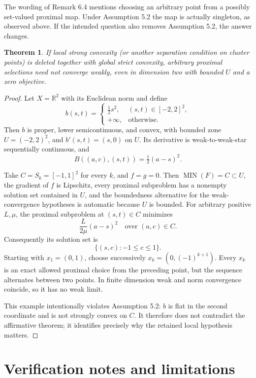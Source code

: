 \documentclass[11pt]{article}
\newtheorem*{theorem}{Theorem}
\newcommand{\MIN}{\operatorname{MIN}}
\newcommand{\R}{\mathbb R}
\begin{document}
The wording of Remark 6.4 mentions choosing an arbitrary point from a possibly
set-valued proximal map. Under Assumption 5.2 the map is actually singleton,
as observed above. If the intended question also removes Assumption 5.2, the
answer changes.

\begin{theorem}
If local strong convexity (or another separation condition on cluster points)
is deleted together with global strict convexity, arbitrary proximal selections
need not converge weakly, even in dimension two with bounded \(U\) and a zero
objective.
\end{theorem}

\begin{proof}
Let \(X=\R^2\) with its Euclidean norm and define
\[
b(s,t)=
\begin{cases}
\tfrac12s^2,&(s,t)\in[-2,2]^2,\\
+\infty,&\text{otherwise}.
\end{cases}
\]
Then \(b\) is proper, lower semicontinuous, and convex, with bounded zone
\(U=(-2,2)^2\), and \(b'(s,t)=(s,0)\) on \(U\). Its derivative is
weak-to-weak-star sequentially continuous, and
\[
B((a,c),(s,t))=\tfrac12(a-s)^2.
\]

Take \(C=S_k=[-1,1]^2\) for every \(k\), and \(f=g=0\). Then
\(\MIN(F)=C\subset U\), the gradient of \(f\) is Lipschitz, every proximal
subproblem has a nonempty solution set contained in \(U\), and the boundedness
alternative for the weak-convergence hypotheses is automatic because \(U\)
is bounded. For arbitrary positive \(L,\mu\), the proximal subproblem at
\((s,t)\in C\) minimizes
\[
\frac{L}{2\mu}(a-s)^2
\quad\text{over }(a,c)\in C.
\]
Consequently its solution set is
\[
\{(s,c):-1\leq c\leq1\}.
\]
Starting with \(x_1=(0,1)\), choose successively
\(x_k=(0,(-1)^{k+1})\). Every \(x_k\) is an exact allowed proximal choice from
the preceding point, but the sequence alternates between two points. In finite
dimension weak and norm convergence coincide, so it has no weak limit.

This example intentionally violates Assumption 5.2: \(b\) is flat in the
second coordinate and is not strongly convex on \(C\). It therefore does not
contradict the affirmative theorem; it identifies precisely why the retained
local hypothesis matters.
\end{proof}

\section*{Verification notes and limitations}
\end{document}
